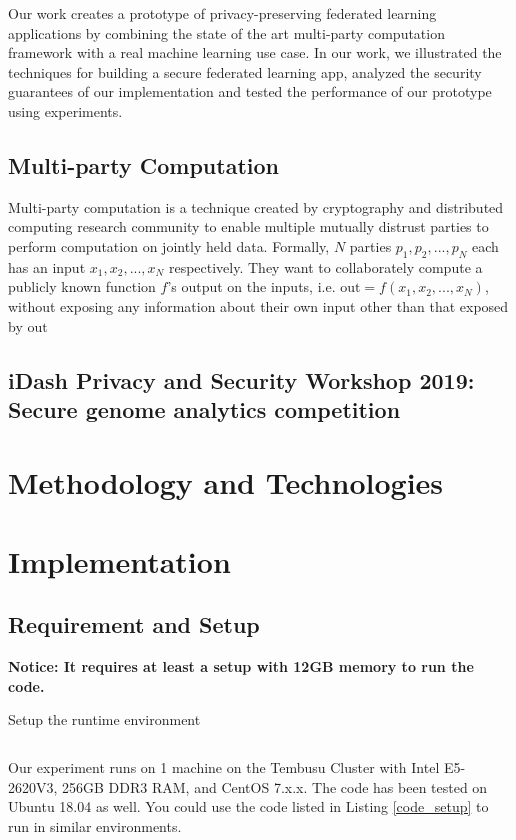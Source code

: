 \documentclass[a4paper,12pt]{article}
\begin{document}
Our work creates a prototype of privacy-preserving federated learning applications by combining the state of the art multi-party computation framework with a real machine learning use case. In our work, we illustrated the techniques for building a secure federated learning app, analyzed the security guarantees of our implementation and tested the performance of our prototype using experiments.

\subsection{Multi-party Computation}
Multi-party computation is a technique created by cryptography and distributed computing research community to enable multiple mutually distrust parties to perform computation on jointly held data. Formally, $N$ parties $p_1, p_2, ..., p_N$ each has an input $x_1, x_2, ..., x_N$ respectively. They want to collaborately compute a publicly known function $f$'s output on the inputs, i.e. $\text{out}=f(x_1, x_2, ..., x_N)$, without exposing any information about their own input other than that exposed by $\text{out}$ 
\subsection{iDash Privacy and Security Workshop 2019: Secure genome analytics competition}

\section{Methodology and Technologies}

\section{Implementation}
\subsection{Requirement and Setup}
\textbf{Notice: It requires at least a setup with 12GB memory to run the code.}

\begin{listing}[H]
	\caption{Setup the runtime environment}
	\inputminted[frame=single,framesep=10pt,linenos]{bash}{1_prep.sh}
	\label{code_setup}
\end{listing}

Our experiment runs on 1 machine on the Tembusu Cluster with Intel E5-2620V3, 256GB DDR3 RAM, and CentOS 7.x.x. The code has been tested on Ubuntu 18.04 as well. You could use the code listed in Listing \ref{code_setup} to run in similar environments.  
\end{document}
